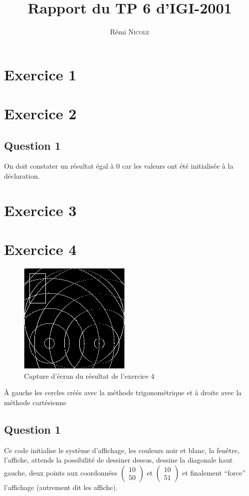 \documentclass{report}
\author{Rémi \textsc{Nicole}}
\title{Rapport du TP 6 d'IGI-2001}
\date{}
\begin{document}
\maketitle

\chapter{Exercice 1}



\chapter{Exercice 2}



\section{Question 1}
On doit constater un résultat égal à 0 car les valeurs ont été initialisée à la
déclaration.

\chapter{Exercice 3}



\chapter{Exercice 4}

\pagebreak
\begin{figure}[h]
	\centering
	\includegraphics{out4.png}
	\caption{Capture d'écran du résultat de l'exercice 4}
\end{figure}
À gauche les cercles créés avec la méthode trigonométrique et à droite
avec la méthode cartésienne

\section{Question 1}
Ce code initialise le système d'affichage, les couleurs noir et blanc, la
fenêtre, l'affiche, attends la possibilité de dessiner dessus, dessine la
diagonale haut gauche, deux points aux coordonnées $ \begin{pmatrix} 10\\ 50
\end{pmatrix} $ et $ \begin{pmatrix} 10\\ 51 \end{pmatrix} $ et finalement
``force'' l'affichage (autrement dit les affiche).
\end{document}
